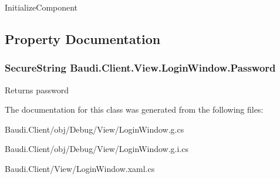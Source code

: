 Initialize\+Component 



\subsection{Property Documentation}
\hypertarget{class_baudi_1_1_client_1_1_view_1_1_login_window_aab55a12a9c6ea04fea9501d825cb12b5}{}
\subsubsection[{Password}]{\setlength{\rightskip}{0pt plus 5cm}Secure\+String Baudi.\+Client.\+View.\+Login\+Window.\+Password\hspace{0.3cm}{\ttfamily [get]}}\label{class_baudi_1_1_client_1_1_view_1_1_login_window_aab55a12a9c6ea04fea9501d825cb12b5}


Returns password 



The documentation for this class was generated from the following files\+:\begin{DoxyCompactItemize}
\item 
Baudi.\+Client/obj/\+Debug/\+View/Login\+Window.\+g.\+cs\item 
Baudi.\+Client/obj/\+Debug/\+View/Login\+Window.\+g.\+i.\+cs\item 
Baudi.\+Client/\+View/Login\+Window.\+xaml.\+cs\end{DoxyCompactItemize}
